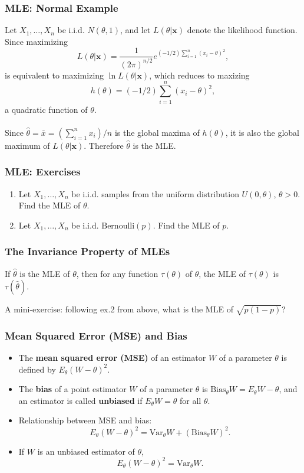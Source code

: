 \documentclass{beamer}
\begin{document}
\begin{frame}
\frametitle{MLE: Normal Example}
Let $X_1,\ldots,X_n$ be i.i.d. $N(\theta,1)$, and let $L(\theta|\mathbf{x})$ denote the likelihood function. Since maximizing
$$
L(\theta|\mathbf{x}) = \frac{1}{(2\pi)^{n/2}}e^{(-1/2)\sum_{i=1}^n(x_i-\theta)^2},
$$
is equivalent to maximizing $\ln L(\theta|\mathbf{x})$, which reduces to maxizing 
$$
h(\theta)=(-1/2)\sum_{i=1}^n(x_i-\theta)^2,
$$
a quadratic function of $\theta$.
\\~\\
Since $\hat{\theta}=\bar{x}=(\sum_{i=1}^n x_i)/n$ is the global maxima of $h(\theta)$, it is also the global maximum of $L(\theta|\mathbf{x})$. Therefore $\hat{\theta}$ is the MLE.
\end{frame}

\begin{frame}
\frametitle{MLE: Exercises}
\begin{enumerate}
\item Let $X_1,\ldots,X_n$ be i.i.d. samples from the uniform distribution $U(0,\theta)$, $\theta > 0$. Find the MLE of $\theta$.
\vspace*{1in}
\item Let $X_1,\ldots,X_n$ be i.i.d. $\text{Bernoulli}(p)$. Find the MLE of $p$.
\vspace*{1in}
\end{enumerate}
\end{frame}

\begin{frame}
\frametitle{The Invariance Property of MLEs}
\begin{theorem}
If $\hat{\theta}$ is the MLE of $\theta$, then for any function $\tau(\theta)$ of $\theta$, the MLE of $\tau(\theta)$ is $\tau(\hat{\theta})$.
\end{theorem}

\vspace*{0.7in}
A mini-exercise: following ex.2 from above, what is the MLE of $\sqrt{p(1-p)}$?
\end{frame}

\begin{frame}
\frametitle{Mean Squared Error (MSE) and Bias}
\begin{itemize}
\item The \textbf{mean squared error (MSE)} of an estimator $W$ of a parameter $\theta$ is defined by $E_{\theta}(W-\theta)^2$.
\item The \textbf{bias} of a point estimator $W$ of a parameter $\theta$ is $\text{Bias}_{\theta}W=E_{\theta}W-\theta$, and an estimator is called \textbf{unbiased} if $E_{\theta}W=\theta$ for all $\theta$.
\item Relationship between MSE and bias:
$$
E_{\theta}(W-\theta)^2 = \text{Var}_{\theta}W + (\text{Bias}_{\theta}W)^2.
$$
\item If $W$ is an unbiased estimator of $\theta$,
$$
E_{\theta}(W-\theta)^2 = \text{Var}_{\theta}W.
$$
\end{itemize}
\end{frame}
\end{document}
